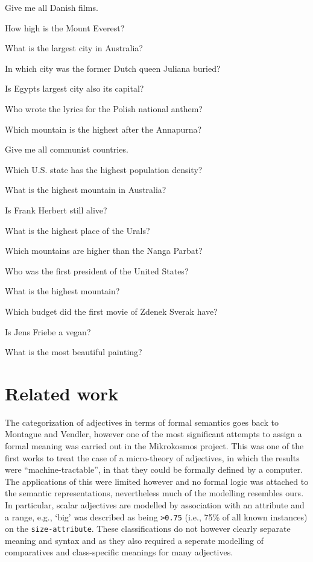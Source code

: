 \documentclass[11pt]{article}
\begin{document}
Give me all Danish films.

How high is the Mount Everest?

What is the largest city in Australia?

In which city was the former Dutch queen Juliana buried?

Is Egypts largest city also its capital?

Who wrote the lyrics for the Polish national anthem?

Which mountain is the highest after the Annapurna?

Give me all communist countries.

Which U.S. state has the highest population density?

What is the highest mountain in Australia?

Is Frank Herbert still alive?

What is the highest place of the Urals?

Which mountains are higher than the Nanga Parbat?

Who was the first president of the United States?

What is the highest mountain?

Which budget did the first movie of Zdenek Sverak have?

Is Jens Friebe a vegan?

What is the most beautiful painting?

\section{Related work}

The categorization of adjectives in terms of formal semantics goes back to Montague and Vendler, however one of the most significant attempts to assign a formal meaning was carried out in the Mikrokosmos project\cite{raskin1995lexical}. This was one of the first works to treat the case of a micro-theory of adjectives, in which the results were ``machine-tractable'', in that they could be formally defined by a computer. The applications of this were limited however and no formal logic was attached to the semantic representations, nevertheless much of the modelling resembles ours. In particular, scalar adjectives are modelled by association with an attribute and a range, e.g., `big' was described as being {\tt >0.75} (i.e., 75\% of all known instances) on the {\tt size-attribute}. These classifications do not however clearly separate meaning and syntax and as they also required a seperate modelling of comparatives and class-specific meanings for many adjectives.
\end{document}
